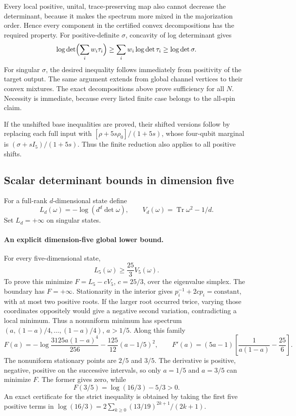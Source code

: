 \documentclass[11pt,a4paper]{article}
\begin{document}
Every local positive, unital, trace-preserving map also cannot
decrease the determinant, because it makes the spectrum more mixed
in the majorization order. Hence every component in the certified
convex decompositions has the required property.
For positive-definite $\sigma$, concavity of log determinant gives
\[
 \log\det\Bigl(\sum_iw_i\tau_i\Bigr)
 \ge\sum_iw_i\log\det\tau_i
 \ge\log\det\sigma.
\]
For singular $\sigma$, the desired inequality follows immediately
from positivity of the target output. The same argument extends
from global channel vertices to their convex mixtures.
The exact decompositions above prove sufficiency for all $N$.
Necessity is immediate, because every listed finite case belongs
to the all-spin claim.

If the unshifted base inequalities are proved, their shifted
versions follow by replacing each full input with
$[\rho+5s\rho_0]/(1+5s)$, whose four-qubit marginal is
$(\sigma+sI_5)/(1+5s)$. Thus the finite reduction also applies
to all positive shifts.

\subsection{Scalar determinant bounds in dimension five}
For a full-rank $d$-dimensional state define
\[
 L_d(\omega)=-\log(d^d\det\omega),\qquad
 V_d(\omega)=\operatorname{Tr}\omega^2-1/d.
\]
Set $L_d=+\infty$ on singular states.

\paragraph{An explicit dimension-five global lower bound.}
For every five-dimensional state,
\begin{equation}\label{t4:eq:d5-burg-lower}
 L_5(\omega)\ge\frac{25}{3}V_5(\omega).
\end{equation}
To prove this minimize $F=L_5-cV_5$, $c=25/3$, over the eigenvalue simplex.
The boundary has $F=+\infty$. Stationarity in the interior gives
$p_i^{-1}+2cp_i=\text{constant}$, with at most two positive roots.
If the larger root occurred twice, varying those coordinates oppositely
would give a negative second variation, contradicting a local minimum.
Thus a nonuniform minimum has spectrum $(a,(1-a)/4,\ldots,(1-a)/4)$,
$a>1/5$. Along this family
\[
 F(a)=-\log\frac{3125a(1-a)^4}{256}
       -\frac{125}{12}(a-1/5)^2,
\qquad
 F'(a)=(5a-1)\left[\frac1{a(1-a)}-\frac{25}{6}\right].
\]
The nonuniform stationary points are $2/5$ and $3/5$. The derivative
is positive, negative, positive on the successive intervals, so only
$a=1/5$ and $a=3/5$ can minimize $F$. The former gives zero, while
\[
 F(3/5)=\log(16/3)-5/3>0.
\]
An exact certificate for the strict inequality is obtained by taking the
first five positive terms in
$\log(16/3)=2\sum_{k\ge0}(13/19)^{2k+1}/(2k+1)$.
\end{document}
